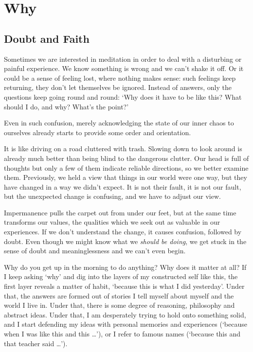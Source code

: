 \chapter{Why}

\section{Doubt and Faith}


\noindent Sometimes we are interested in meditation in order to deal
with a disturbing or painful experience. We know something is wrong and
we can't shake it off. Or it could be a sense of feeling lost, where
nothing makes sense: such feelings keep returning, they don't let
themselves be ignored. Instead of answers, only the questions keep going
round and round: `Why does it have to be like this? What should I do,
and why? What's the point?'

Even in such confusion, merely acknowledging the state of our inner
chaos to ourselves already starts to provide some order and orientation.

It is like driving on a road cluttered with trash. Slowing down to look
around is already much better than being blind to the dangerous clutter.
Our head is full of thoughts but only a few of them indicate reliable
directions, so we better examine them. Previously, we held a view that
things in our world were one way, but they have changed in a way we
didn't expect. It is not their fault, it is not our fault, but the
unexpected change is confusing, and we have to adjust our view.

Impermanence pulls the carpet out from under our feet, but at the same
time transforms our values, the qualities which we seek out as valuable
in our experiences. If we don't understand the change, it causes
confusion, followed by doubt. Even though we might know what we
\emph{should be doing}, we get stuck in the sense of doubt and
meaninglessness and we can't even begin.


Why do you get up in the morning to do anything? Why does it matter at
all? If I keep asking `why' and dig into the layers of my constructed
self like this, the first layer reveals a matter of habit, `because this
is what I did yesterday'. Under that, the answers are formed out of
stories I tell myself about myself and the world I live in. Under that,
there is some degree of reasoning, philosophy and abstract ideas. Under
that, I am desperately trying to hold onto something solid, and I start
defending my ideas with personal memories and experiences (`because when
I was like this and this \ldots{}'), or I refer to famous names
(`because this and that teacher said \ldots{}').

